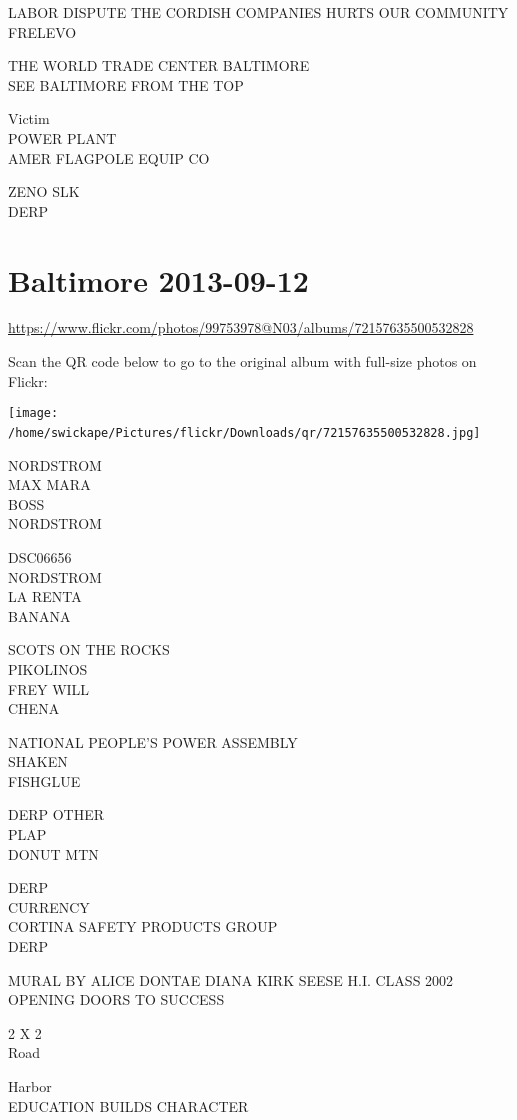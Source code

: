 \documentclass[10pt,letterpaper]{article}
\begin{document}
LABOR DISPUTE THE CORDISH COMPANIES HURTS OUR COMMUNITY\\
FRELEVO

THE WORLD TRADE CENTER BALTIMORE\\
SEE BALTIMORE FROM THE TOP

Victim\\
POWER PLANT\\
AMER FLAGPOLE EQUIP CO

ZENO SLK\\
DERP
\

\section*{Baltimore 2013-09-12}

\url{https://www.flickr.com/photos/99753978@N03/albums/72157635500532828}

Scan the QR code below to go to the original album with full-size photos on Flickr:

\texttt{[image: /home/swickape/Pictures/flickr/Downloads/qr/72157635500532828.jpg]}
\

NORDSTROM\\
MAX MARA\\
BOSS\\
NORDSTROM

DSC06656\\
NORDSTROM\\
LA RENTA\\
BANANA

SCOTS ON THE ROCKS\\
PIKOLINOS\\
FREY WILL\\
CHENA

NATIONAL PEOPLE'S POWER ASSEMBLY\\
SHAKEN\\
FISHGLUE

DERP OTHER\\
PLAP\\
DONUT MTN

DERP\\
CURRENCY\\
CORTINA SAFETY PRODUCTS GROUP\\
DERP

MURAL BY ALICE DONTAE DIANA KIRK SEESE H.I. CLASS 2002\\
OPENING DOORS TO SUCCESS

2 X 2\\
Road

Harbor\\
EDUCATION BUILDS CHARACTER
\end{document}
